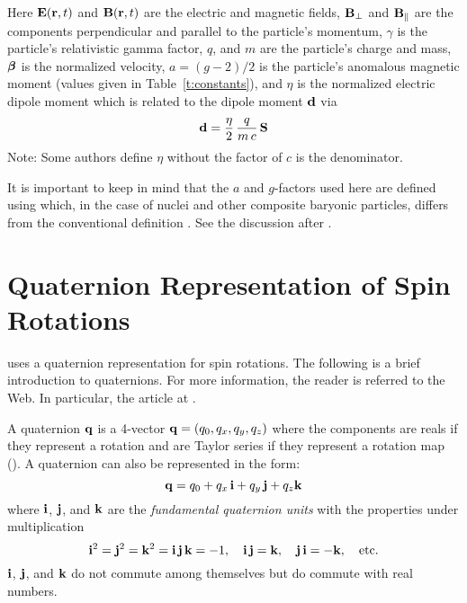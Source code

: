 Here ${\bf E} ({\bf r} ,t)$ and ${\bf B} ({\bf r} ,t)$ are the electric and magnetic fields, ${\bf B}_\perp$
and ${\bf B}_\parallel$ are the components perpendicular and parallel to the particle's momentum,
$\gamma$ is the particle's relativistic gamma factor, $q$, and $m$ are the particle's charge and
mass, $\boldsymbol{\beta}$ is the normalized velocity, $a = (g-2)/2$ is the particle's anomalous magnetic
moment (values given in Table~\ref{t:constants}), and $\eta$ is the normalized electric dipole
moment which is related to the dipole moment ${\bf d}$ via
\begin{equation}
  {\bf d} = \frac{\eta}{2} \, \frac{q}{m \, c} \, {\bf S}
\end{equation}
Note: Some authors define $\eta$ without the factor of $c$ is the denominator.

It is important to keep in mind that the $a$ and $g$-factors used here are defined using 
which, in the case of nuclei and other composite baryonic particles, differs from the conventional
definition . See the discussion after .

\section{Quaternion Representation of Spin Rotations}
\label{s:quat}

\bmad uses a quaternion representation for spin rotations. The following is a brief introduction to
quaternions. For more information, the reader is referred to the Web. In particular, the
 article at . 

A quaternion ${\bf q}$ is a 4-vector ${\bf q} = (q_0, q_x, q_y, q_z)$ where the components are reals if they represent a
rotation and are Taylor series if they represent a rotation map (). A quaternion can
also be represented in the form:
\begin{equation}
  {\bf q} = q_0 + q_x \, {\bf i} + q_y \, {\bf j} + q_z {\bf k}
  \label{qqqqq}
\end{equation}
where ${\bf i}$, ${\bf j}$, and ${\bf k}$ are the {\em fundamental quaternion units} with the properties
under multiplication
\begin{equation}
  {\bf i}^2 = {\bf j}^2 = {\bf k}^2 = {\bf i} \, {\bf j} \, {\bf k} = -1, \quad 
  {\bf i} \, {\bf j} = {\bf k}, \quad {\bf j} \, {\bf i} = -{\bf k}, \quad \text{etc.}
\end{equation}
${\bf i}$, ${\bf j}$, and ${\bf k}$ do not commute among themselves but do commute with real numbers. 

